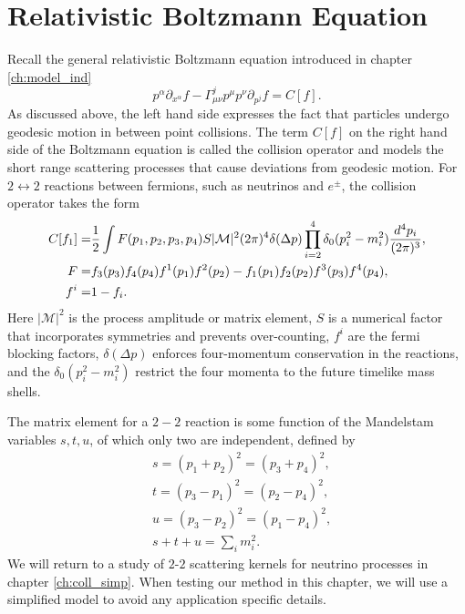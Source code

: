\section{Relativistic Boltzmann Equation }\label{boltzmann_basics}

Recall the general relativistic Boltzmann equation introduced in chapter \ref{ch:model_ind}
\begin{equation}\label{boltzmann}
p^\alpha\partial_{x^\alpha}f-\Gamma^j_{\mu\nu}p^\mu p^\nu\partial_{p^j}f=C[f].
\end{equation}
As discussed above, the left hand side expresses the fact that particles undergo geodesic motion in between point collisions. The term $C[f]$ on the right hand side of the Boltzmann equation is called the collision operator and models the short range scattering processes that cause deviations from geodesic motion. For $2\leftrightarrow 2$ reactions between fermions, such as neutrinos and $e^\pm$, the collision operator takes the form
\begin{align}\label{coll}
C[f_1]=&\frac{1}{2}\int F(p_1,p_2,p_3,p_4) S |\mathcal{M}|^2(2\pi)^4\delta(\Delta p)\prod_{i=2}^4\delta_0(p_i^2-m_i^2)\frac{d^4p_i}{(2\pi)^3},\\
F=&f_3(p_3)f_4(p_4)f^1(p_1)f^2(p_2)-f_1(p_1)f_2(p_2)f^3(p_3)f^4(p_4),\notag\\
f^i=&1- f_i.\notag
\end{align}
Here $|\mathcal{M}|^2$ is the process amplitude or matrix element, $S$ is a numerical factor that incorporates symmetries and prevents over-counting, $f^i$ are the fermi blocking factors, $\delta(\Delta p)$ enforces four-momentum conservation in the reactions, and the $\delta_0(p_i^2-m_i^2)$ restrict the four momenta to the future timelike mass shells.


The matrix element for a $2-2$ reaction is some function of the Mandelstam variables $s, t, u$, of which only two are independent, defined by 
\begin{align}\label{Mandelstam}
&s=(p_1+p_2)^2=(p_3+p_4)^2,\\
&t=(p_3-p_1)^2=(p_2-p_4)^2,\\
&u=(p_3-p_2)^2=(p_1-p_4)^2,\\
&s+t+u=\sum_i m_i^2.
\end{align}
We will return to a study of $2$-$2$ scattering kernels for neutrino processes in chapter \ref{ch:coll_simp}.  When testing our method in this chapter, we will use a simplified model to avoid any application specific details.

